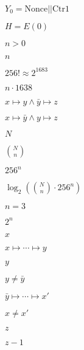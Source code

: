 \documentclass{article}
\begin{document}
$Y_0 = \mathrm{Nonce} || \mathrm{Ctr 1}$
\pagebreak

$H = E(0)$
\pagebreak

$n > 0$
\pagebreak

$n$
\pagebreak

$256! \approx 2^{1683} $
\pagebreak

$n \cdot 1638$
\pagebreak

$x \mapsto y \wedge \bar{y} \mapsto z$
\pagebreak

$x \mapsto \bar{y} \wedge y \mapsto z$
\pagebreak

$N$
\pagebreak

$N \choose n$
\pagebreak

$256^n$
\pagebreak

$\log_2 \left({N \choose n} \cdot 256^n\right)$
\pagebreak

$n = 3$
\pagebreak

$2^n$
\pagebreak

$x$
\pagebreak

$x\mapsto \cdots \mapsto y$
\pagebreak

$y$
\pagebreak

$y \neq \bar{y}$
\pagebreak

$\bar{y} \mapsto \cdots \mapsto x'$
\pagebreak

$x \neq x'$
\pagebreak

$z$
\pagebreak

$z - 1$
\pagebreak
\end{document}
